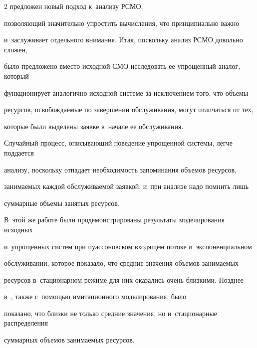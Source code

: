 \begin{multicols}{2}
предложен новый подход к~анализу РСМО,


поз\-во\-ля\-ющий значительно упростить вычисления, что принципиально важно 


и~заслуживает отдельного внимания. Итак, поскольку анализ РСМО довольно сложен,




было предложено вместо исходной СМО исследовать ее упрощенный аналог, который 


функционирует аналогично исходной сис\-те\-ме за исключением того,  что объемы 


ресурсов, освобождаемые по за\-вер\-шении обслуживания, могут отличаться от тех, %


которые были выделены заявке в~начале ее обслуживания.










Случайный процесс, опи\-сы\-ва\-ющий поведение упрощенной сис\-те\-мы, легче поддается 


анализу, поскольку отпадает необходимость запоминания объемов ресурсов, 


занимаемых каж\-дой обслуживаемой заявкой, и~при анализе надо пом\-нить лишь 


суммарные объемы занятых ресурсов.


В~этой же работе были продемонстрированы результаты моделирования исходных 


и~упрощенных сис\-тем при пуассоновском входящем потоке и~экспоненциальном 


обслуживании, которое показало,  что средние значения объемов занимаемых 


ресурсов в~стационарном режиме для них оказались очень близкими. Позднее 


в~\cite{Naumov_2_2014}, также с~помощью имитационного моделирования, было 


показано, что близ\-ки не только средние значения, но и~стационарные распределения 


суммарных объемов занимаемых ресурсов.






\end{multicols}
